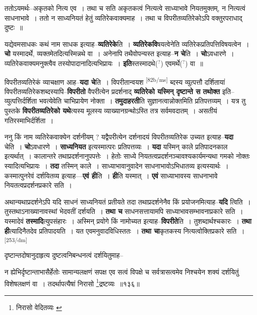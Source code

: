 \documentclass[article,12pt,a4paper]{memoir}
\newcommand{\unclear}[1]{($^{?}$#1)}
\begin{document}
	  \pstart ततोऽयमर्थः--अकृतको नित्य एव । तथा च सति अकृतकत्वं नित्यत्वे साध्याभावे नियतमुक्तम्, न नित्यत्वं साधनाभावे । ततो न साध्यनियतं हेतुं व्यतिरेकवाक्यमाह । तथा च विपरीतव्यतिरेकोऽपि वक्तुरपराधाद् दुष्टः ॥
	\pend
      

	  \pstart यद्येवमसाधकः कथं नाम साधक इत्याह--\textbf{व्यतिरेके}ति । \textbf{व्यतिरेकवि}षयत्वेनेति व्यतिरेकप्रतिपत्तिविषयत्वेन । \textbf{चो} यस्मादर्थे, व्यक्तमेतदित्यस्मिन्नथे वा । अनेनापि तथैवोपन्यस्त इत्याह--\textbf{न चे}ति । \textbf{चो}ऽवधारणे । व्यतिरेकवाक्यमनुक्त्वैव तस्योपादानादित्यभिप्रायः । \textbf{इति}स्तस्मादथे\unclear{} एवमर्थे\unclear{} वा ॥
	\pend
      

	  \pstart विपरीतव्यतिरेकं व्याचक्षाण आह--\textbf{यदा चे}ति । विपरीतान्वयश \leavevmode\textsuperscript{\rmlatinfont\tiny [82b/ms]} ब्दस्य व्युत्पत्तौ दर्शितायां विपरीतव्यतिरेकशब्दस्यापि--\textbf{विपरीतो} वैपरीत्येन प्रदर्शनाद् \textbf{व्यतिरेको यस्मिन् दृष्टान्ते स तथोक्त} इति--व्युत्पत्तिर्दर्शिता भवत्येवेति चाभिप्रायेण नोक्ता । \textbf{तमुदाहरती}ति सुज्ञानत्वान्नोक्तमिति प्रतिपत्तव्यम् । यत्र तु पुस्तके \textbf{विपरीतव्यतिरेको यथे}त्यस्य मूलस्य व्याख्यानग्रन्थोऽस्ति तत्र सर्वमवदातम् । असतीयं गतिरस्माभिर्दर्शिता ।
	\pend
      

	  \pstart ननु किं नाम व्यतिरेकवाक्येन दर्शनीयम् ? यद्वैपरीत्येन दर्शनादयं विपरीतव्यतिरेक उच्यत इत्याह--\textbf{यदा} चेति । \textbf{चो}ऽवधारणे । \textbf{साध्यनियत} इत्यस्मात्परः प्रतिपत्तव्यः । \textbf{यदा} यस्मिन् काले प्रतिपादनकाल इत्यर्थात् । कालान्तरे तथाप्रदर्शनानुपपत्तेः । हेतोः साध्ये नियतत्वप्रदर्शनञ्चावश्यकार्यमन्यथा गमको नोक्तः स्यादित्यभिप्रायः । \textbf{तदा} तस्मिन् काले । साध्याभावानुवादेन साधनाभावोऽभिधातव्य इत्यस्यार्थः । कस्मात्पुनरेवं दर्शयितव्य इत्याह—\textbf{एवं ही}ति । \textbf{ही}ति यस्मात् । \textbf{एवं} साध्याभावस्य साधनाभावे नियतत्वप्रदर्शनप्रकारे सति ।
	\pend
      

	  \pstart अथान्यथाप्रदर्शनेऽपि यदि साधनं साध्यनियतं प्रतीयते तदा तथाप्रदर्शनेनैव किं प्रयोजनमित्याह--\textbf{यदि} त्विति । तुस्तथाऽनाख्यानावस्थां भेदवतीं दर्शयति । \textbf{तथा च} साधनसत्तायामपि साध्याभावसम्भावनाप्रकारे सति । यस्मादेवं \textbf{तस्मादि}त्युपसंहारः । अस्मिन् प्रयोगे किं नामोच्यत इत्याह--\textbf{विपरीते}ति । तुशब्दार्थश्चकारः । \textbf{तथा ही}त्यादिनैतदेव प्रतिपादयति । यत एवमनुवादविधिस्ततः । \textbf{तथा चा}कृतकस्य नित्यत्वोक्तिप्रकारे सति ।   \leavevmode\textsuperscript{\rmlatinfont\tiny [253/dm]} 
	  
	दृष्टान्तदोषानुदाहृत्य दुष्टत्वनिबन्धनत्वं दर्शयितुमाह-- 
	  
	न ह्येभिर्दृष्टान्ताभासैर्हेतोः सामान्यलक्षणं सपक्ष एव सत्वं विपक्षे च सर्वत्रासत्वमेव निश्चयेन शक्यं दर्शयितुं विशेषलक्षणं वा । तदर्थापत्यैषां निरासो \footnote{निरासो वेदितव्यः \cite{dp-msB} \cite{dp-msD} \cite{dp-edP} \cite{dp-edH} \cite{dp-edE} \cite{dp-edN}}द्रष्टव्यः ॥१३६॥ 
	  
\end{document}
